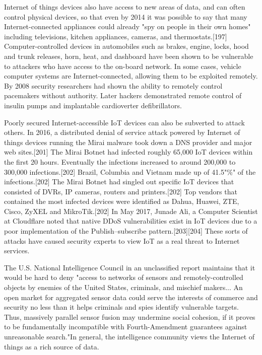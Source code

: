 \documentclass[12pt, a4paper, twoside]{article}
\begin{document}
Internet of things devices also have access to new areas of data, and can often control physical devices, so that even by 2014 it was possible to say that many Internet-connected appliances could already "spy on people in their own homes" including televisions, kitchen appliances, cameras, and thermostats.[197] Computer-controlled devices in automobiles such as brakes, engine, locks, hood and trunk releases, horn, heat, and dashboard have been shown to be vulnerable to attackers who have access to the on-board network. In some cases, vehicle computer systems are Internet-connected, allowing them to be exploited remotely. By 2008 security researchers had shown the ability to remotely control pacemakers without authority. Later hackers demonstrated remote control of insulin pumps and implantable cardioverter defibrillators.

Poorly secured Internet-accessible IoT devices can also be subverted to attack others. In 2016, a distributed denial of service attack powered by Internet of things devices running the Mirai malware took down a DNS provider and major web sites.[201] The Mirai Botnet had infected roughly 65,000 IoT devices within the first 20 hours. Eventually the infections increased to around 200,000 to 300,000 infections.[202] Brazil, Columbia and Vietnam made up of 41.5"\%" of the infections.[202] The Mirai Botnet had singled out specific IoT devices that consisted of DVRs, IP cameras, routers and printers.[202] Top vendors that contained the most infected devices were identified as Dahua, Huawei, ZTE, Cisco, ZyXEL and MikroTik.[202] In May 2017, Junade Ali, a Computer Scientist at Cloudflare noted that native DDoS vulnerabilities exist in IoT devices due to a poor implementation of the Publish–subscribe pattern.[203][204] These sorts of attacks have caused security experts to view IoT as a real threat to Internet services.

The U.S. National Intelligence Council in an unclassified report maintains that it would be hard to deny "access to networks of sensors and remotely-controlled objects by enemies of the United States, criminals, and mischief makers... An open market for aggregated sensor data could serve the interests of commerce and security no less than it helps criminals and spies identify vulnerable targets. Thus, massively parallel sensor fusion may undermine social cohesion, if it proves to be fundamentally incompatible with Fourth-Amendment guarantees against unreasonable search."In general, the intelligence community views the Internet of things as a rich source of data.
\end{document}
